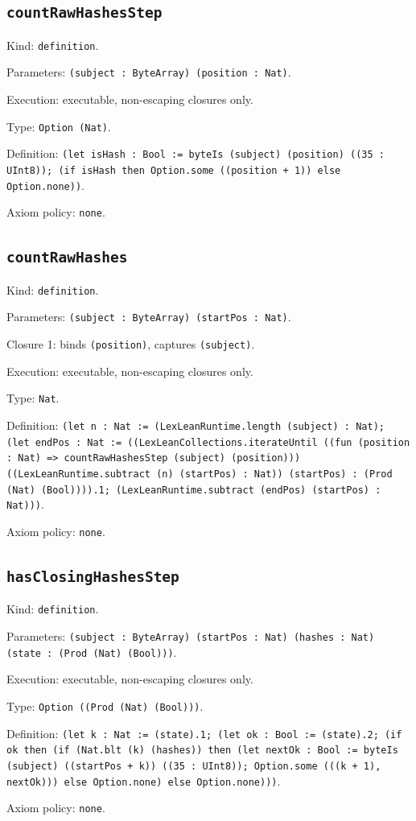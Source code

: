 \documentclass[11pt]{article}
\begin{document}
\subsection*{\texttt{countRawHashesStep}}
\noindent Kind: \texttt{definition}.\par
\noindent Parameters: \texttt{(subject : ByteArray) (position : Nat)}.\par
\noindent Execution: executable, non-escaping closures only.\par
\noindent Type: \texttt{Option (Nat)}.\par
\noindent Definition: \texttt{(let isHash : Bool := byteIs (subject) (position) ((35 : UInt8)); (if isHash then Option.some ((position + 1)) else Option.none))}.\par
\noindent Axiom policy: \texttt{none}.\par
\subsection*{\texttt{countRawHashes}}
\noindent Kind: \texttt{definition}.\par
\noindent Parameters: \texttt{(subject : ByteArray) (startPos : Nat)}.\par
\noindent Closure 1: binds \texttt{(position)}, captures \texttt{(subject)}.\par
\noindent Execution: executable, non-escaping closures only.\par
\noindent Type: \texttt{Nat}.\par
\noindent Definition: \texttt{(let n : Nat := (LexLeanRuntime.length (subject) : Nat); (let endPos : Nat := ((LexLeanCollections.iterateUntil ((fun (position : Nat) => countRawHashesStep (subject) (position))) ((LexLeanRuntime.subtract (n) (startPos) : Nat)) (startPos) : (Prod (Nat) (Bool)))).1; (LexLeanRuntime.subtract (endPos) (startPos) : Nat)))}.\par
\noindent Axiom policy: \texttt{none}.\par
\subsection*{\texttt{hasClosingHashesStep}}
\noindent Kind: \texttt{definition}.\par
\noindent Parameters: \texttt{(subject : ByteArray) (startPos : Nat) (hashes : Nat) (state : (Prod (Nat) (Bool)))}.\par
\noindent Execution: executable, non-escaping closures only.\par
\noindent Type: \texttt{Option ((Prod (Nat) (Bool)))}.\par
\noindent Definition: \texttt{(let k : Nat := (state).1; (let ok : Bool := (state).2; (if ok then (if (Nat.blt (k) (hashes)) then (let nextOk : Bool := byteIs (subject) ((startPos + k)) ((35 : UInt8)); Option.some (((k + 1), nextOk))) else Option.none) else Option.none)))}.\par
\noindent Axiom policy: \texttt{none}.\par
\end{document}
